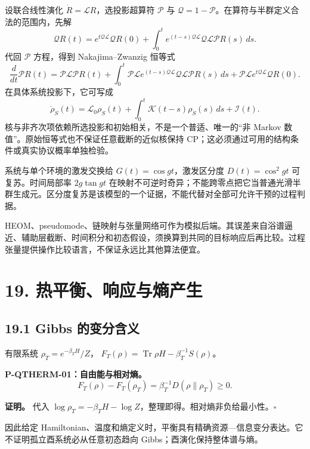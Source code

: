 \documentclass[
  11pt,
  oneside]{book}
\begin{document}
设联合线性演化 \(\dot R=\mathcal LR\)，选投影超算符 \(\mathcal P\) 与
\(\mathcal Q=1-\mathcal P\)。在算符与半群定义合法的范围内，先解 \[
\mathcal QR(t)=e^{t\mathcal Q\mathcal L}\mathcal QR(0)
+\int_0^t e^{(t-s)\mathcal Q\mathcal L}
\mathcal Q\mathcal L\mathcal PR(s)\,ds.
\] 代回 \(\mathcal P\) 方程，得到 Nakajima--Zwanzig 恒等式 \[
\frac d{dt}\mathcal PR(t)=\mathcal P\mathcal L\mathcal PR(t)
+\int_0^t\mathcal P\mathcal L e^{(t-s)\mathcal Q\mathcal L}
\mathcal Q\mathcal L\mathcal PR(s)\,ds
+\mathcal P\mathcal L e^{t\mathcal Q\mathcal L}\mathcal QR(0).
\] 在具体系统投影下，它可写成 \[
\dot\rho_S(t)=\mathcal L_0\rho_S(t)
+\int_0^t\mathcal K(t-s)\rho_S(s)\,ds+\mathcal I(t).
\] 核与非齐次项依赖所选投影和初始相关，不是一个普适、唯一的``非 Markov
数值''。原始恒等式也不保证任意截断的近似核保持
CP；这必须通过可用的结构条件或真实协议概率单独检验。

系统与单个环境的激发交换给 \(G(t)=\cos gt\)，激发区分度
\(D(t)=\cos^2gt\) 可复苏。时间局部率 \(2g\tan gt\)
在映射不可逆时奇异；不能跨零点把它当普通光滑半群生成元。区分度复苏是该模型的一个证据，不能代替对全部可允许干预的过程判据。

HEOM、pseudomode、链映射与张量网络可作为模拟后端。其误差来自浴谱逼近、辅助层截断、时间积分和初态假设，须换算到共同的目标响应后再比较。过程张量提供操作比较语言，不保证永远比其他算法便宜。

\hypertarget{ch-19}{%
\chapter{19. 热平衡、响应与熵产生}\label{ch-19}}

\hypertarget{gibbs-ux7684ux53d8ux5206ux542bux4e49}{%
\section{19.1 Gibbs
的变分含义}\label{gibbs-ux7684ux53d8ux5206ux542bux4e49}}

有限系统 \(\rho_T=e^{-\beta_TH}/Z\)，
\(F_T(\rho)=\operatorname{Tr}\rho H-\beta_T^{-1}S(\rho)\)。

\protect\hypertarget{p-qtherm-01}{}{}

\textbf{P-QTHERM-01：自由能与相对熵。} \[
F_T(\rho)-F_T(\rho_T)
=\beta_T^{-1}D(\rho\|\rho_T)\ge0.
\]

\textbf{证明。} 代入
\(\log\rho_T=-\beta_TH-\log Z\)，整理即得。相对熵非负给最小性。\(\square\)

因此给定
Hamiltonian、温度和熵定义时，平衡具有精确资源---信息变分表达。它不证明孤立酉系统必从任意初态趋向
Gibbs；酉演化保持整体谱与熵。
\end{document}
